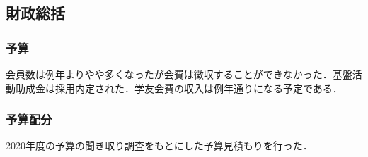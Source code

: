 \subsection*{財政総括}


\subsubsection*{予算}
会員数は例年よりやや多くなったが会費は徴収することができなかった．基盤活動助成金は採用内定された．学友会費の収入は例年通りになる予定である．

\subsubsection*{予算配分}
2020年度の予算の聞き取り調査をもとにした予算見積もりを行った．
